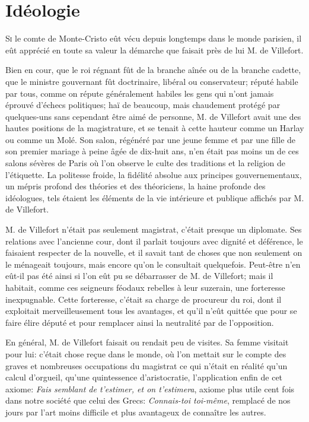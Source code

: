 \chapter{Idéologie}

\lettrine{S}{i} le comte de Monte-Cristo eût vécu depuis longtemps dans le monde parisien, il eût apprécié en toute sa valeur la démarche que faisait près de lui M. de Villefort. 

\zz
Bien en cour, que le roi régnant fût de la branche aînée ou de la branche cadette, que le ministre gouvernant fût doctrinaire, libéral ou conservateur; réputé habile par tous, comme on répute généralement habiles les gens qui n'ont jamais éprouvé d'échecs politiques; haï de beaucoup, mais chaudement protégé par quelques-uns sans cependant être aimé de personne, M. de Villefort avait une des hautes positions de la magistrature, et se tenait à cette hauteur comme un Harlay ou comme un Molé. Son salon, régénéré par une jeune femme et par une fille de son premier mariage à peine âgée de dix-huit ans, n'en était pas moins un de ces salons sévères de Paris où l'on observe le culte des traditions et la religion de l'étiquette. La politesse froide, la fidélité absolue aux principes gouvernementaux, un mépris profond des théories et des théoriciens, la haine profonde des idéologues, tels étaient les éléments de la vie intérieure et publique affichés par M. de Villefort. 

M. de Villefort n'était pas seulement magistrat, c'était presque un diplomate. Ses relations avec l'ancienne cour, dont il parlait toujours avec dignité et déférence, le faisaient respecter de la nouvelle, et il savait tant de choses que non seulement on le ménageait toujours, mais encore qu'on le consultait quelquefois. Peut-être n'en eût-il pas été ainsi si l'on eût pu se débarrasser de M. de Villefort; mais il habitait, comme ces seigneurs féodaux rebelles à leur suzerain, une forteresse inexpugnable. Cette forteresse, c'était sa charge de procureur du roi, dont il exploitait merveilleusement tous les avantages, et qu'il n'eût quittée que pour se faire élire député et pour remplacer ainsi la neutralité par de l'opposition. 

En général, M. de Villefort faisait ou rendait peu de visites. Sa femme visitait pour lui: c'était chose reçue dans le monde, où l'on mettait sur le compte des graves et nombreuses occupations du magistrat ce qui n'était en réalité qu'un calcul d'orgueil, qu'une quintessence d'aristocratie, l'application enfin de cet axiome: \textit{Fais semblant de t'estimer, et on t'estimera}, axiome plus utile cent fois dans notre société que celui des Grecs: \textit{Connais-toi toi-même}, remplacé de nos jours par l'art moins difficile et plus avantageux de connaître les autres. 

